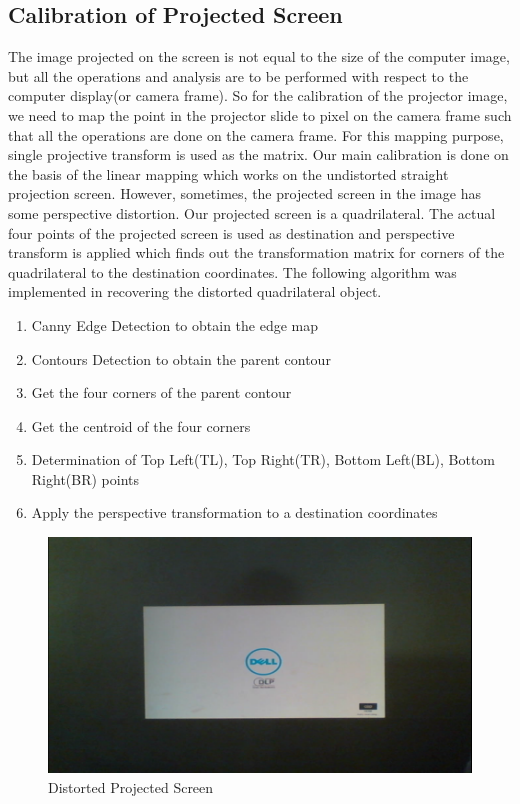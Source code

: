 \documentclass[12pt, a4paper]{article}
\begin{document}
\subsection{Calibration of Projected Screen}
	The image projected on the screen is not equal to the size of the computer image, but all the operations and analysis are to be performed with respect to the computer display(or camera frame). So for the calibration of the projector image, we need to map the point in the projector slide to pixel on the camera frame such that all the operations are done on the camera frame. For this mapping purpose, single projective transform is used as the matrix. Our main calibration is done on the basis of the linear mapping which works on the undistorted straight projection screen.
	However, sometimes, the projected screen in the image has some perspective distortion. Our projected screen is a quadrilateral. The actual four points of the projected screen is used as destination and perspective transform is applied which finds out the transformation matrix for corners of the quadrilateral to the destination coordinates. The following algorithm was implemented in recovering the distorted quadrilateral object.
\begin{enumerate}
\item Canny Edge Detection to obtain the edge map
\item Contours Detection to obtain the parent contour
\item Get the four corners of the parent contour
\item Get the centroid of the four corners
\item Determination of Top Left(TL), Top Right(TR), Bottom Left(BL), Bottom Right(BR) points
\item Apply the perspective transformation to a destination coordinates
\end{enumerate}
	
\begin{figure}[htp]
	\centering
	\includegraphics[scale=0.20]{looma1.png}
	\caption{Distorted Projected Screen}
	\label{}
\end{figure}
\end{document}
